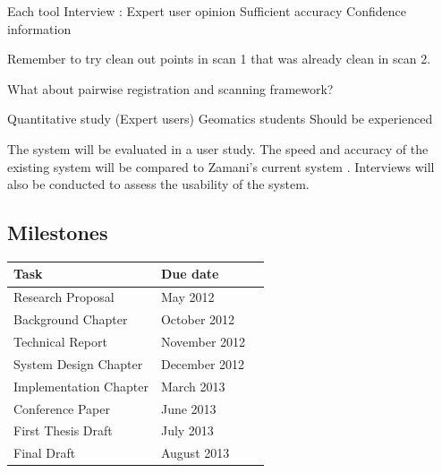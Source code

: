 \documentclass[10pt,twocolumn]{article}
\begin{document}
Each tool
	Interview : Expert user opinion
		Sufficient accuracy
		Confidence information
			
Remember to try clean out points in scan 1 that was already clean in scan 2.

What about pairwise registration and scanning framework?


Quantitative study (Expert users)
	Geomatics students
	Should be experienced

The system will be evaluated in a user study. The speed and accuracy of the existing system will be compared to Zamani's current system \cite{Leica2012}. Interviews will also be conducted to assess the usability of the system.

\subsection{Milestones}
\begin{tabular}{llr}
\hline
Task & Due date \\
\hline
Research Proposal & May 2012\\
Background Chapter & October 2012\\
Technical Report & November 2012\\
System Design Chapter & December 2012\\
Implementation Chapter & March 2013\\
Conference Paper & June 2013\\
First Thesis Draft & July 2013\\
Final Draft & August 2013\\
\hline
\end{tabular}










\end{document}
